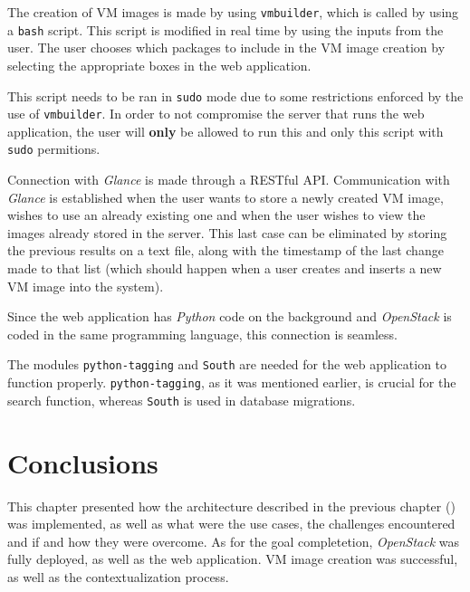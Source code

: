 The creation of VM images is made by using \texttt{vmbuilder}, which is called by using a \texttt{bash} script. This script is modified in real time by using the inputs from the user. The user chooses which packages to include in the VM image creation by selecting the appropriate boxes in the web application.

This script needs to be ran in \texttt{sudo} mode due to some restrictions enforced by the use of \texttt{vmbuilder}. In order to not compromise the server that runs the web application, the user will \textbf{only} be allowed to run this and only this script with \texttt{sudo} permitions.

Connection with \textit{Glance} is made through a RESTful API. Communication with \textit{Glance} is established when the user wants to store a newly created VM image, wishes to use an already existing one and when the user wishes to view the images already stored in the server. This last case can be eliminated by storing the previous results on a text file, along with the timestamp of the last change made to that list (which should happen when a user creates and inserts a new VM image into the system).

Since the web application has \textit{Python} code on the background and \textit{OpenStack} is coded in the same programming language, this connection is seamless.

The modules \texttt{python-tagging} and \texttt{South} are needed for the web application to function properly. \texttt{python-tagging}, as it was mentioned earlier, is crucial for the search function, whereas \texttt{South} is used in database migrations.
\section{Conclusions}

This chapter presented how the architecture described in the previous chapter () was implemented, as well as what were the use cases, the challenges encountered and if and how they were overcome. 
As for the goal completetion, \textit{OpenStack} was fully deployed, as well as the web application. VM image creation was successful, as well as the contextualization process.
